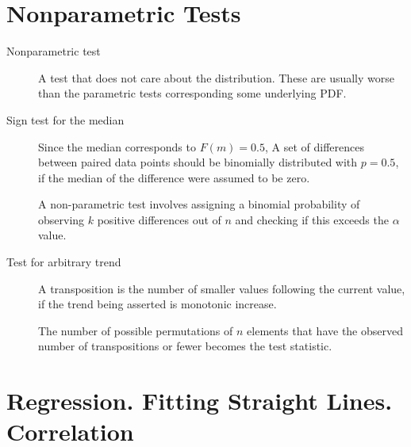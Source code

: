 \section{Nonparametric Tests}

\begin{description}
    \item[Nonparametric test] A test that does not care about the distribution. These are
          usually worse than the parametric tests corresponding some underlying PDF.

    \item[Sign test for the median] Since the median corresponds to $ F(m) = 0.5 $,
          A set of differences between paired data points should be binomially distributed
          with $ p = 0.5 $, if the median of the difference were assumed to be zero. \par
          A non-parametric test involves assigning a binomial probability of observing
          $ k $ positive differences out of $ n $ and checking if this exceeds the
          $ \alpha $ value.

    \item[Test for arbitrary trend] A transposition is the number of smaller values
          following the current value, if the trend being asserted is monotonic increase.
          \par
          The number of possible permutations of $ n $ elements that have the observed
          number of transpositions or fewer becomes the test statistic.
\end{description}

\section{Regression. Fitting Straight Lines. Correlation}

